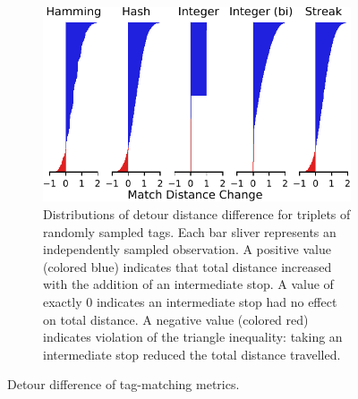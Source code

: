 \begin{figure}
\begin{center}
\begin{minipage}{\linewidth}
\begin{subfigure}[b]{\linewidth}
\includegraphics[width=\linewidth]{img/detour_difference/bitweight=0dot5+seed=1+title=low-triplet-analysis+_data_hathash_hash=6b0749ef97a58721+_script_fullcat_hash=297c4fe09078e17b+ext=}
\caption{
Distributions of detour distance difference for triplets of randomly sampled tags.
Each bar sliver represents an independently sampled observation.
A positive value (colored blue) indicates that total distance increased with the addition of an intermediate stop.
A value of exactly 0 indicates an intermediate stop had no effect on total distance.
A negative value (colored red) indicates violation of the triangle inequality: taking an intermediate stop reduced the total distance travelled.
} \label{fig:detour_difference_distribution}

\end{subfigure}
\end{minipage}

\caption{
Detour difference of tag-matching metrics.
}
\label{fig:detour_difference}

\end{center}
\end{figure}
